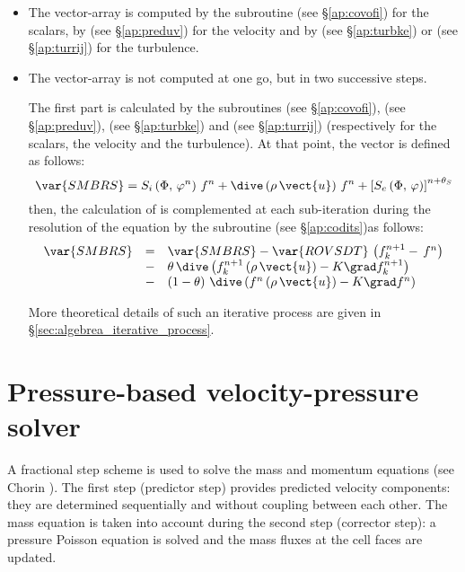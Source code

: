 \begin{itemize}
\item The vector-array  is computed by the subroutine %
 (see \S \ref{ap:covofi}) for the scalars, by  (see \S \ref{ap:preduv}) for the velocity and by %
 (see \S \ref{ap:turbke}) or  (see \S \ref{ap:turrij}) for the turbulence.

\item The vector-array  is not computed at one go, but in two
successive steps.

The first part is calculated by the subroutines  (see \S \ref{ap:covofi}), %
(see \S \ref{ap:preduv}),  (see \S \ref{ap:turbke}) and  (see \S \ref{ap:turrij}) (respectively for the scalars, the
velocity and the turbulence). At that point, the vector  is
defined as follows:
\begin{equation}
\var{SMBRS}=S_{i} \left(\Phi , \, \varphi ^{n}\right)\,f^{n}
+\dive \left(\rho \,\vect{u} \right)\,f^{n}
+\left[ S_{e} \left(\Phi , \, \varphi \right)\right] ^{n+\theta _{S}}%
\end{equation}%
then, the calculation of  is complemented at each sub-iteration
during the resolution of the equation by the subroutine  (see \S \ref{ap:codits})as
follows:
\begin{equation}
\begin{array}{r c l}
\var{SMBRS} & = & \var{SMBRS}-\var{ROVSDT}\,\left(f^{n+1}_{k}-\,f^{n} \right) \\
&-&\theta \,\dive \left( f^{n+1}_{k} \left(\rho \,\vect{u}\right)
- K\grad f^{n+1}_{k}\right) \\
&-& \left(1-\theta \right)\,\dive \left( f^{n} \left(\rho \,\vect{u}\right) - K%
\grad f^{n} \right)%
\end{array}%
\end{equation}

More theoretical details of such an iterative process are given in \S \ref{sec:algebrea_iterative_process}.

\end{itemize}

\section{Pressure-based velocity-pressure solver}
A fractional step scheme is used to solve the mass and momentum equations
(see Chorin \cite{Chorin:????}). The first step (predictor step) provides predicted velocity
components: they are determined sequentially and without coupling between
each other. The mass equation is taken into account during the second step
(corrector step): a pressure Poisson equation is solved and the mass fluxes
at the cell faces are updated.

